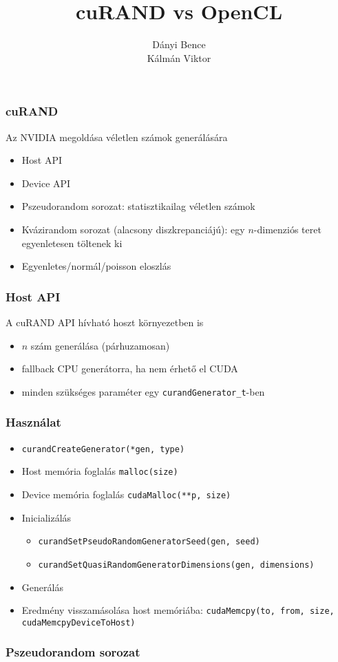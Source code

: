 \documentclass[xetex]{beamer}
\title{cuRAND vs OpenCL}
\author{Dányi Bence\\ Kálmán Viktor}
\begin{document}
  \frame{\titlepage}
  \begin{frame}
    \frametitle{cuRAND}
    Az NVIDIA megoldása véletlen számok generálására
    \begin{itemize}
      \item Host API
      \item Device API
      \item Pszeudorandom sorozat: statisztikailag véletlen számok
      \item Kvázirandom sorozat (alacsony diszkrepanciájú): egy $n$-dimenziós teret egyenletesen töltenek ki
      \item Egyenletes/normál/poisson eloszlás
    \end{itemize}
  \end{frame}
  \begin{frame}
    \frametitle{Host API}
    A cuRAND API hívható hoszt környezetben is
    \begin{itemize}
      \item $n$ szám generálása (párhuzamosan)
      \item fallback CPU generátorra, ha nem érhető el CUDA
      \item minden szükséges paraméter egy \texttt{curandGenerator\_t}-ben
    \end{itemize}
  \end{frame}
  \begin{frame}
    \frametitle{Használat}
    \begin{itemize}
      \item \texttt{curandCreateGenerator(*gen, type)}
      \item Host memória foglalás \texttt{malloc(size)}
      \item Device memória foglalás \texttt{cudaMalloc(**p, size)}
      \item Inicializálás
        \begin{itemize}
          \item \texttt{curandSetPseudoRandomGeneratorSeed(gen, seed)}
          \item \texttt{curandSetQuasiRandomGeneratorDimensions(gen, dimensions)}
        \end{itemize}
      \item Generálás
      \item Eredmény visszamásolása host memóriába: \texttt{cudaMemcpy(to, from, size, cudaMemcpyDeviceToHost)}
    \end{itemize}
  \end{frame}
  \begin{frame}
    \frametitle{Pszeudorandom sorozat}
  \end{frame}
\end{document}
